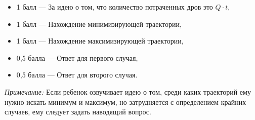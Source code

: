 \begin{itemize}
	\item{1 балл} --- За идею о том, что количество потраченных дров это $Q \cdot t$,
	\item{1 балл} --- Нахождение минимизирующей траектории,
	\item{1 балл} --- Нахождение максимизирующей траектории,
	\item{0{,}5 балла} --- Ответ для первого случая,
	\item{0{,}5 балла} --- Ответ для второго случая.
\end{itemize}

\textit{Примечание:} Если ребенок озвучивает идею о том, среди каких траекторий ему нужно искать минимум и максимум, но затрудняется с определением крайних случаев, ему следует задать наводящий вопрос.